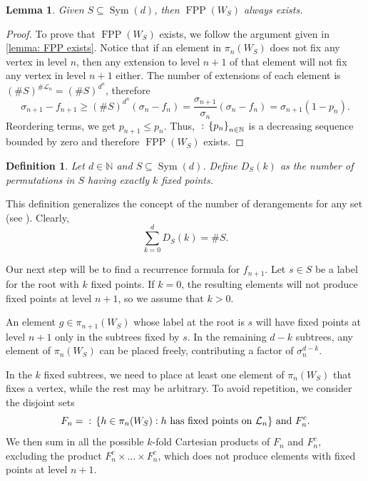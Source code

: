 \documentclass{amsart}
\def\set#1{{\def\st{\;:\;}\left\{#1\right\}}}
\def\NN{\mathbb N}
\DeclareMathOperator{\FPP}{FPP}
\DeclareMathOperator{\Sym}{Sym}
\DeclareMathOperator{\st}{st}
\newtheorem{Lemma}[Proposition]{Lemma}
\newtheorem{Definition}[Proposition]{Definition}
\begin{document}
\begin{Lemma}
Given $S \subseteq \Sym(d)$, then $\FPP(W_S)$ always exists.
\end{Lemma}

\begin{proof}
To prove that $\FPP(W_S)$ exists, we follow the argument given in \cref{lemma: FPP exists}. Notice that if an element in $\pi_n(W_S)$ does not fix any vertex in level $n$, then any extension to level $n+1$ of that element will not fix any vertex in level $n+1$ either. The number of extensions of each element is $(\#S)^{\# \mathcal{L}_n} = (\#S)^{d^n}$, therefore $$\sigma_{n+1} - f_{n+1} \geq (\#S)^{d^n} (\sigma_n - f_n) = \frac{\sigma_{n+1}}{\sigma_n}(\sigma_n - f_n) = \sigma_{n+1}(1-p_n).$$ Reordering terms, we get $p_{n+1} \leq p_n$. Thus, $\set{p_n}_{n \in \NN}$ is a decreasing sequence bounded by zero and therefore $\FPP(W_S)$ exists.
\end{proof}

\begin{Definition}
Let $d \in \NN$ and $S \subseteq \Sym(d)$. Define $D_S(k)$ as the number of permutations in $S$ having exactly $k$ fixed points.
\label{definition: derangements}
\end{Definition}

This definition generalizes the concept of the number of derangements for any set (see \cite{Hassani2003}). Clearly, $$\sum_{k = 0}^d D_S(k) = \# S.$$

Our next step will be to find a recurrence formula for $f_{n+1}$. Let $s \in S$ be a label for the root with $k$ fixed points. If $k = 0$, the resulting elements will not produce fixed points at level $n+1$, so we assume that $k > 0$. 

An element $g \in \pi_{n+1}(W_S)$ whose label at the root is $s$ will have fixed points at level $n+1$ only in the subtrees fixed by $s$. In the remaining $d-k$ subtrees, any element of $\pi_n(W_S)$ can be placed freely, contributing a factor of $\sigma_n^{d-k}$. 

In the $k$ fixed subtrees, we need to place at least one element of $\pi_n(W_S)$ that fixes a vertex, while the rest may be arbitrary. To avoid repetition, we consider the disjoint sets $$F_n = \set{h \in \pi_n(W_S): \text{$h$ has fixed points on $\mathcal{L}_n$}} \text{ and } F_n^c.$$ We then sum in all the possible $k$-fold Cartesian products of $F_n$ and $F_n^c$, excluding the product $F_n^c \times \dots \times F_n^c$, which does not produce elements with fixed points at level $n+1$. 
\end{document}
